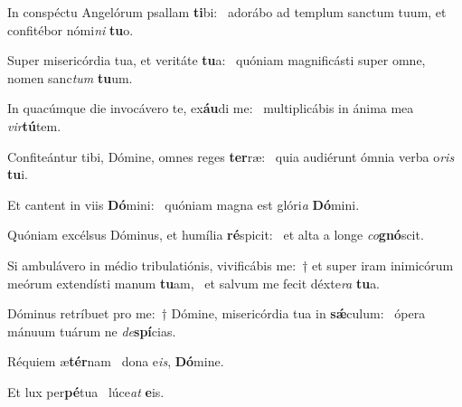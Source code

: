 \item In conspéctu Angelórum psallam \textbf{ti}bi:~\psstar{} adorábo ad templum sanctum tuum, et confitébor nómi\textit{ni} \textbf{tu}o.

\item Super misericórdia tua, et veritáte \textbf{tu}a:~\psstar{} quóniam magnificásti super omne, nomen sanc\textit{tum} \textbf{tu}um.

\item In quacúmque die invocávero te, ex\textbf{áu}di me:~\psstar{} multiplicábis in ánima mea \textit{vir}\textbf{tú}tem.

\item Confiteántur tibi, Dómine, omnes reges \textbf{ter}ræ:~\psstar{} quia audiérunt ómnia verba o\textit{ris} \textbf{tu}i.

\item Et cantent in viis \textbf{Dó}mini:~\psstar{} quóniam magna est glóri\textit{a} \textbf{Dó}mini.

\item Quóniam excélsus Dóminus, et humília \textbf{ré}spicit:~\psstar{} et alta a longe \textit{co}\textbf{gnó}scit.

\item Si ambulávero in médio tribulatiónis, vivificábis me:~† et super iram inimicórum meórum extendísti manum \textbf{tu}am,~\psstar{} et salvum me fecit déxte\textit{ra} \textbf{tu}a.

\item Dóminus retríbuet pro me:~† Dómine, misericórdia tua in \textbf{sǽ}culum:~\psstar{} ópera mánuum tuárum ne \textit{de}\textbf{spí}cias.

\item Réquiem æ\textbf{tér}nam~\psstar{} dona e\textit{is}, \textbf{Dó}mine.

\item Et lux per\textbf{pé}tua~\psstar{} lúce\textit{at} \textbf{e}is.